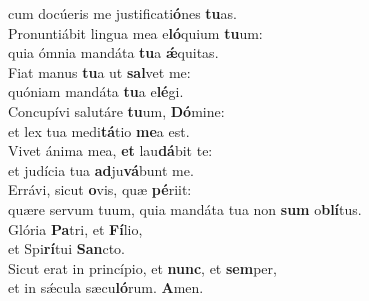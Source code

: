 \oddverse cum docúeris me justificati\textbf{ó}nes \textbf{tu}as.\\
\evenverse Pronuntiábit lingua mea e\textbf{ló}quium \textbf{tu}um:~\*\\
\evenverse quia ómnia mandáta \textbf{tu}a \textbf{ǽ}quitas.\\
\oddverse Fiat manus \textbf{tu}a ut \textbf{sal}vet me:~\*\\
\oddverse quóniam mandáta \textbf{tu}a e\textbf{lé}gi.\\
\evenverse Concupívi salutáre \textbf{tu}um, \textbf{Dó}mine:~\*\\
\evenverse et lex tua medi\textbf{tá}tio \textbf{me}a est.\\
\oddverse Vivet ánima mea, \textbf{et} lau\textbf{dá}bit te:~\*\\
\oddverse et judícia tua \textbf{ad}ju\textbf{vá}bunt me.\\
\evenverse Errávi, sicut \textbf{o}vis, quæ \textbf{pé}riit:~\*\\
\evenverse quære servum tuum, quia mandáta tua non \textbf{sum} o\textbf{blí}tus.\\
\oddverse Glória \textbf{Pa}tri, et \textbf{Fí}lio,~\*\\
\oddverse et Spi\textbf{rí}tui \textbf{San}cto.\\
\evenverse Sicut erat in princípio, et \textbf{nunc}, et \textbf{sem}per,~\*\\
\evenverse et in sǽcula sæcu\textbf{ló}rum. \textbf{A}men.\\
